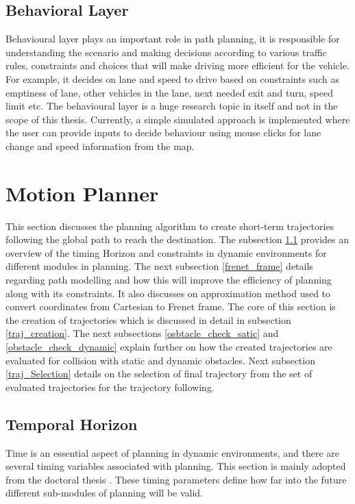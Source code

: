 \subsection{Behavioral Layer}
Behavioural layer plays an important role in path planning, it is responsible for understanding the scenario and making decisions according to various traffic rules, constraints and choices that will make driving more efficient for the vehicle. For example, it decides on lane and speed to drive based on constraints such as emptiness of lane, other vehicles in the lane, next needed exit and turn, speed limit etc. The behavioural layer is a huge research topic in itself and not in the scope of this thesis. Currently, a simple simulated approach is implemented where the user can provide inputs to decide behaviour using mouse clicks for lane change and speed information from the map.

\section{Motion Planner} \label{motion_planner}

This section discusses the planning algorithm to create short-term trajectories following the global path to reach the destination. The subsection \ref{timing_constraints} provides an overview of the timing Horizon and constraints in dynamic environments for different modules in planning. The next subsection \ref{frenet_frame} details regarding path modelling and how this will improve the efficiency of planning along with its constraints. It also discusses on approximation method used to convert coordinates from Cartesian to Frenet frame. The core of this section is the creation of trajectories which is discussed in detail in subsection \ref{traj_creation}. The next subsections \ref{osbtacle_check_satic} and \ref{obstacle_check_dynamic} explain further on how the created trajectories are evaluated for collision with static and dynamic obstacles. Next subsection \ref{traj_Selection} details on the selection of final trajectory from the set of evaluated trajectories for the trajectory following.

\subsection{Temporal Horizon} \label{timing_constraints}
Time is an essential aspect of planning in dynamic environments, and there are several timing variables associated with planning. This section is mainly adopted from the doctoral thesis \cite{eth_timing_constraints}. These timing parameters define how far into the future different sub-modules of planning will be valid. 

